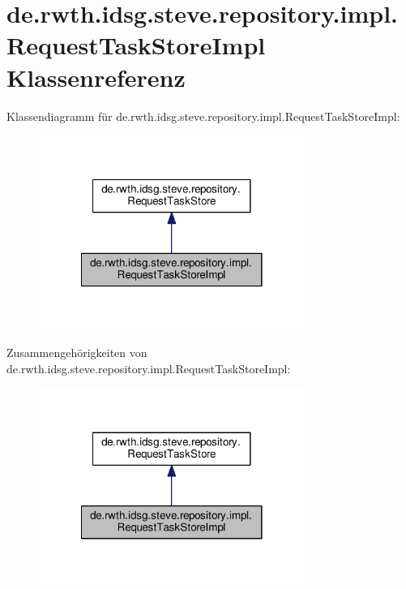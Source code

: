 \hypertarget{classde_1_1rwth_1_1idsg_1_1steve_1_1repository_1_1impl_1_1_request_task_store_impl}{\section{de.\-rwth.\-idsg.\-steve.\-repository.\-impl.\-Request\-Task\-Store\-Impl Klassenreferenz}
\label{classde_1_1rwth_1_1idsg_1_1steve_1_1repository_1_1impl_1_1_request_task_store_impl}
}


Klassendiagramm für de.\-rwth.\-idsg.\-steve.\-repository.\-impl.\-Request\-Task\-Store\-Impl\-:\nopagebreak
\begin{figure}[H]
\begin{center}
\leavevmode
\includegraphics[width=246pt]{classde_1_1rwth_1_1idsg_1_1steve_1_1repository_1_1impl_1_1_request_task_store_impl__inherit__graph}
\end{center}
\end{figure}


Zusammengehörigkeiten von de.\-rwth.\-idsg.\-steve.\-repository.\-impl.\-Request\-Task\-Store\-Impl\-:\nopagebreak
\begin{figure}[H]
\begin{center}
\leavevmode
\includegraphics[width=246pt]{classde_1_1rwth_1_1idsg_1_1steve_1_1repository_1_1impl_1_1_request_task_store_impl__coll__graph}
\end{center}
\end{figure}
